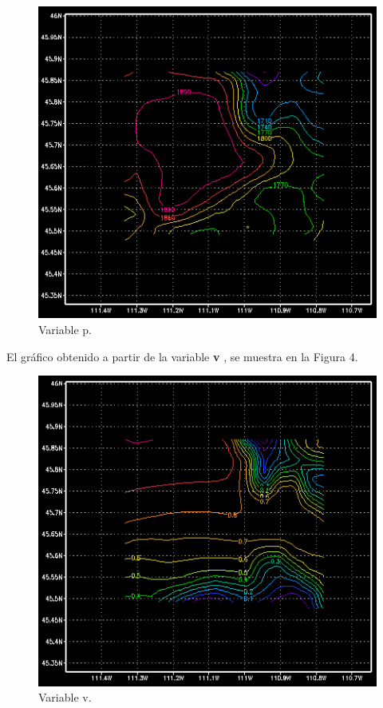 \documentclass[12pt,letter]{article}
\begin{document}
\begin{figure}
\caption{Variable p.}
\includegraphics[scale=1]{grads_p.png}
\end{figure}
\noindent El gr\'afico obtenido a partir de la variable \textbf{v} , se muestra en la Figura 4.

\begin{figure}
\caption{Variable v.}
\includegraphics[scale=1]{grads_v.png}
\end{figure}
\clearpage
\end{document}
